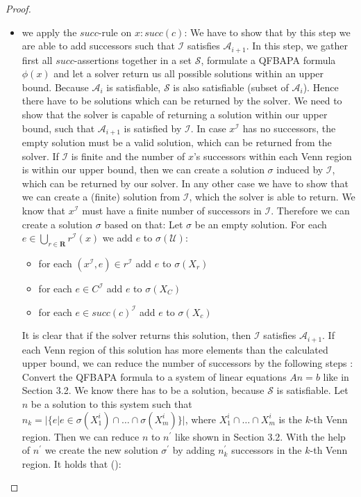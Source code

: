 \documentclass{book}
\theoremstyle{break}
\theoremstyle{definition}
\begin{document}
\begin{proof}
\begin{itemize}
\item we apply the $succ$-rule on $x:succ(c)$: We have to show that by this step we are able to add successors such that $\mathcal{I}$ satisfies $\mathcal{A}_{i+1}$. In this step, we gather first all $succ$-assertions together in a set $\mathcal{S}$, formulate a QFBAPA formula $\phi(x)$ and let a solver return us all possible solutions within an upper bound. Because $\mathcal{A}_i$ is satisfiable, $\mathcal{S}$ is also satisfiable (subset of $\mathcal{A}_i$). Hence there have to be solutions which can be returned by the solver. We need to show that the solver is capable of returning a solution within our upper bound, such that $\mathcal{A}_{i+1}$ is satisfied by $\mathcal{I}$. In case $x^\mathcal{I}$ has no successors, the empty solution must be a valid solution, which can be returned from the solver. If $\mathcal{I}$ is finite and the number of $x$'s successors within each Venn region is within our upper bound, then we can create a solution $\sigma$ induced by $\mathcal{I}$, which can be returned by our solver. In any other case we have to show that we can create a (finite) solution from $\mathcal{I}$, which the solver is able to return. We know that $x^\mathcal{I}$ must have a finite number of successors in $\mathcal{I}$. Therefore we can create a solution $\sigma$ based on that: Let $\sigma$ be an empty solution. For each $e\in \bigcup_{r\in\mathbf{R}}r^\mathcal{I}(x)$ we add $e$ to $\sigma(\mathcal{U})$:
\begin{itemize}
\item for each $(x^\mathcal{I},e)\in r^\mathcal{I}$ add $e$ to $\sigma(X_r)$
\item for each $e\in C^\mathcal{I}$ add $e$ to $\sigma(X_C)$
\item for each $e\in succ(c)^\mathcal{I}$ add $e$ to $\sigma(X_c)$
\end{itemize}
It is clear that if the solver returns this solution, then $\mathcal{I}$ satisfies $\mathcal{A}_{i+1}$. If each Venn region of this solution has more elements than the calculated upper bound, we can reduce the number of successors by the following steps \cite{knapsack}: Convert the QFBAPA formula to a system of linear equations $An=b$ like in Section 3.2. We know there has to be a solution, because $\mathcal{S}$ is satisfiable. Let $n$ be a solution to this system such that $n_k=|\{e|e\in \sigma(X^i_1)\cap\dots\cap\sigma(X^i_m)\}|$, where $X^i_1\cap\dots\cap X^i_m$ is the $k$-th Venn region. Then we can reduce $n$ to $n^\prime$ like shown in Section 3.2. With the help of $n^\prime$ we create the new solution $\sigma^\prime$ by adding $n^\prime_k$ successors in the $k$-th Venn region. It holds that (\dag):

\end{itemize}
\end{proof}
\end{document}
